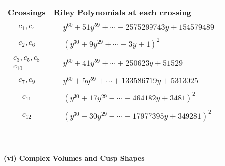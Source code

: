 \documentclass[1p]{elsarticle_modified}
\theoremstyle{definition}
\begin{document}
\begin{tabular}{m{50pt}|m{274pt}}
Crossings & \hspace{64pt}Riley Polynomials at each crossing \\
\hline $$\begin{aligned}c_{1},c_{4}\end{aligned}$$&$\begin{aligned}
&y^{60}+51 y^{59}+\cdots-2575299743 y+154579489
\end{aligned}$\\
\hline $$\begin{aligned}c_{2},c_{6}\end{aligned}$$&$\begin{aligned}
&(y^{30}+9 y^{29}+\cdots-3 y+1)^{2}
\end{aligned}$\\
\hline $$\begin{aligned}c_{3},c_{5},c_{8}\\c_{10}\end{aligned}$$&$\begin{aligned}
&y^{60}+41 y^{59}+\cdots+250623 y+51529
\end{aligned}$\\
\hline $$\begin{aligned}c_{7},c_{9}\end{aligned}$$&$\begin{aligned}
&y^{60}+5 y^{59}+\cdots+133586719 y+5313025
\end{aligned}$\\
\hline $$\begin{aligned}c_{11}\end{aligned}$$&$\begin{aligned}
&(y^{30}+17 y^{29}+\cdots-464182 y+3481)^{2}
\end{aligned}$\\
\hline $$\begin{aligned}c_{12}\end{aligned}$$&$\begin{aligned}
&(y^{30}-30 y^{29}+\cdots-17977395 y+349281)^{2}
\end{aligned}$\\
\hline
\end{tabular}\\~\\
\newpage\flushleft \textbf{(vi) Complex Volumes and Cusp Shapes}
\end{document}
